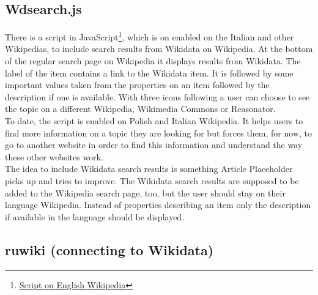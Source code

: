 \subsection{Wdsearch.js}
There is a script in JavaScript\footnote{\href{https://en.wikipedia.org/w/index.php?title=MediaWiki:Wdsearch.js&action=raw&ctype=text/javascript}{Script on English Wikipedia}}, which is on enabled on the Italian and other Wikipedias, to include search results from Wikidata on Wikipedia. At the bottom of the regular search page on Wikipedia it displays results from Wikidata. The label of the item contains a link to the Wikidata item. It is followed by some important values taken from the properties on an item followed by the description if one is available. With three icons following a user can choose to see the topic on a different Wikipedia, Wikimedia Commons or Reasonator. \\
To date, the script is enabled on Polish and Italian Wikipedia. It helps users to find more information on a topic they are looking for but forces them, for now, to go to another website in order to find this information and understand the way these other websites work. \\
The idea to include Wikidata search results is something Article Placeholder picks up and tries to improve. The Wikidata search results are supposed to be added to the Wikipedia search page, too, but the user should stay on their language Wikipedia. Instead of properties describing an item only the description if available in the language should be displayed. 

\subsection{ruwiki (connecting to Wikidata)}